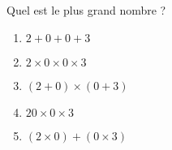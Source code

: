 Quel est le plus grand nombre ?
\begin{multicols}{5}
\begin{enumerate}[A/]
\item $2 + 0 + 0 + 3$
\item $2\times0\times0\times 3$
\item $(2 + 0)\times(0 + 3)$
\item $20\times0\times3$
\item $(2\times0) + (0\times3)$
\end{enumerate}
\end{multicols}